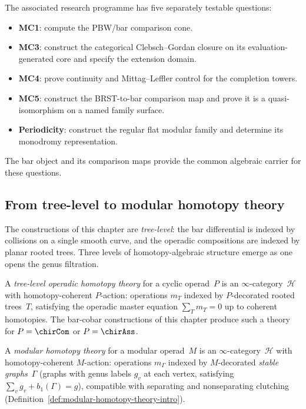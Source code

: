 The associated research programme has five separately testable
questions:
\begin{itemize}
\item \textbf{MC1}: compute the PBW/bar comparison cone.
\item \textbf{MC3}: construct the categorical
Clebsch--Gordan closure on its evaluation-generated core and specify
the extension domain.
\item \textbf{MC4}: prove continuity and Mittag--Leffler control for
the completion towers.
\item \textbf{MC5}: construct the BRST-to-bar comparison map and prove
it is a quasi-isomorphism on a named family surface.
\item \textbf{Periodicity}: construct the regular flat modular family
and determine its monodromy representation.
\end{itemize}
The bar object and its comparison maps provide the common algebraic
carrier for these questions.

\subsection{From tree-level to modular homotopy theory}
\label{subsec:tree-to-modular}

The constructions of this chapter are \emph{tree-level}: the bar
differential is indexed by collisions on a single smooth curve, and
the operadic compositions are indexed by planar rooted trees. Three
levels of homotopy-algebraic structure emerge as one opens the genus
filtration.

\begin{definition}
\label{def:tree-level-homotopy}
A \emph{tree-level operadic homotopy theory} for a cyclic operad~$P$
is an $\infty$-category~$\mathcal{H}$ with homotopy-coherent
$P$-action: operations $m_T$ indexed by $P$-decorated rooted
trees~$T$, satisfying the operadic master equation $\sum_T m_T = 0$
up to coherent homotopies. The bar-cobar constructions of this
chapter produce such a theory for $P = \chirCom$ or $P = \chirAss$.
\end{definition}

\begin{definition}
\label{def:modular-homotopy-abstract}
A \emph{modular homotopy theory} for a modular operad~$M$ is an
$\infty$-category~$\mathcal{H}$ with homotopy-coherent $M$-action:
operations $m_\Gamma$ indexed by $M$-decorated \emph{stable
graphs}~$\Gamma$ (graphs with genus labels $g_v$ at each vertex,
satisfying $\sum_v g_v + b_1(\Gamma) = g$), compatible with
separating and nonseparating clutching
(Definition~\ref{def:modular-homotopy-theory-intro}).
\end{definition}

